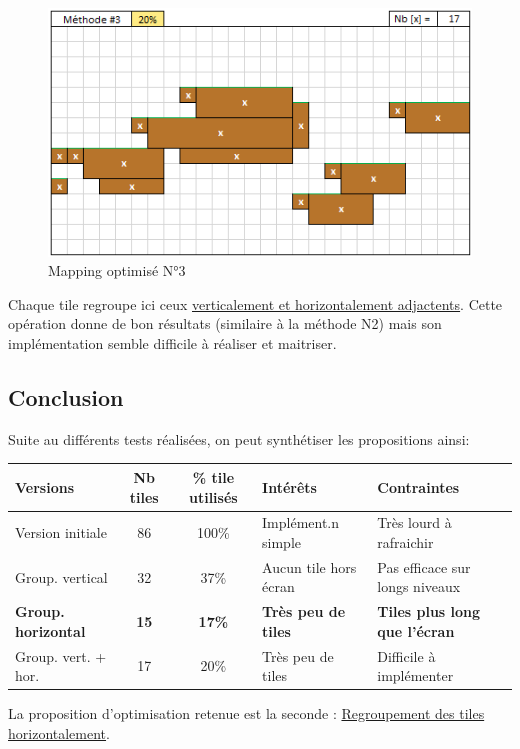 \documentclass{report}
\begin{document}
\newpage

\begin{figure}[h!]
	\caption{\label{Mapping opti 3} Mapping optimis\'{e} N°3}
	\includegraphics[scale=1]{Opti_tiles_004.png}
	\centering
\end{figure}
Chaque tile regroupe ici ceux \underline{verticalement et horizontalement adjactents}. Cette op\'{e}ration donne de bon r\'{e}sultats (similaire à la m\'{e}thode N2)
mais son impl\'{e}mentation semble difficile à r\'{e}aliser et maitriser.

				\subsection{Conclusion}
Suite au diff\'{e}rents tests r\'{e}alis\'{e}es, on peut synth\'{e}tiser les propositions ainsi:


\begin{tabular}{|l|c|c|l|l|}
\hline
Versions & Nb tiles & \% tile utilis\'{e}s & Int\'{e}rêts & Contraintes \\
\hline
Version initiale & 86 & 100\% & Impl\'{e}ment.n simple & Tr\`{e}s lourd à rafraichir \\
\hline
\hline
Group. vertical & 32 & 37\% & Aucun tile hors \'{e}cran & Pas efficace sur longs niveaux \\
\textbf{Group. horizontal} & \textbf{15} & \textbf{17\%} & \textbf{Tr\`{e}s peu de tiles} & \textbf{Tiles plus long que l'\'{e}cran} \\
Group. vert. + hor. & 17 & 20\% & Tr\`{e}s peu de tiles & Difficile à impl\'{e}menter \\
\hline
\end{tabular}


La proposition d'optimisation retenue est la seconde : \underline{Regroupement des tiles horizontalement}.

	\listoffigures
\end{document}
